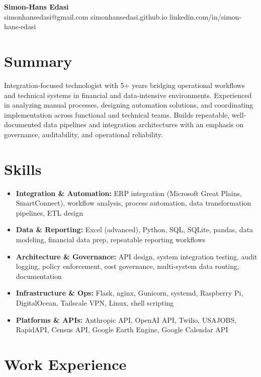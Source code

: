 \documentclass[11pt,a4paper]{article}
\begin{document}
\begin{center}
    {\LARGE \textbf{Simon-Hans Edasi}} \\[6pt]
    simonhansedasi@gmail.com \hfill \textbar \hfill
    simonhansedasi.github.io \hfill \textbar \hfill
    linkedin.com/in/simon-hans-edasi
\end{center}

\section*{Summary}
Integration-focused technologist with 5+ years bridging operational workflows and technical systems
in financial and data-intensive environments. Experienced in analyzing manual processes, designing
automation solutions, and coordinating implementation across functional and technical teams. Builds
repeatable, well-documented data pipelines and integration architectures with an emphasis on
governance, auditability, and operational reliability.

\section*{Skills}
\begin{itemize}
  \item \textbf{Integration \& Automation:} ERP integration (Microsoft Great Plains, SmartConnect),
        workflow analysis, process automation, data transformation pipelines, ETL design
  \item \textbf{Data \& Reporting:} Excel (advanced), Python, SQL, SQLite, pandas, data modeling,
        financial data prep, repeatable reporting workflows
  \item \textbf{Architecture \& Governance:} API design, system integration testing, audit logging,
        policy enforcement, cost governance, multi-system data routing, documentation
  \item \textbf{Infrastructure \& Ops:} Flask, nginx, Gunicorn, systemd, Raspberry Pi, DigitalOcean,
        Tailscale VPN, Linux, shell scripting
  \item \textbf{Platforms \& APIs:} Anthropic API, OpenAI API, Twilio, USAJOBS, RapidAPI, Census API,
        Google Earth Engine, Google Calendar API
\end{itemize}

\section*{Work Experience}
\end{document}
